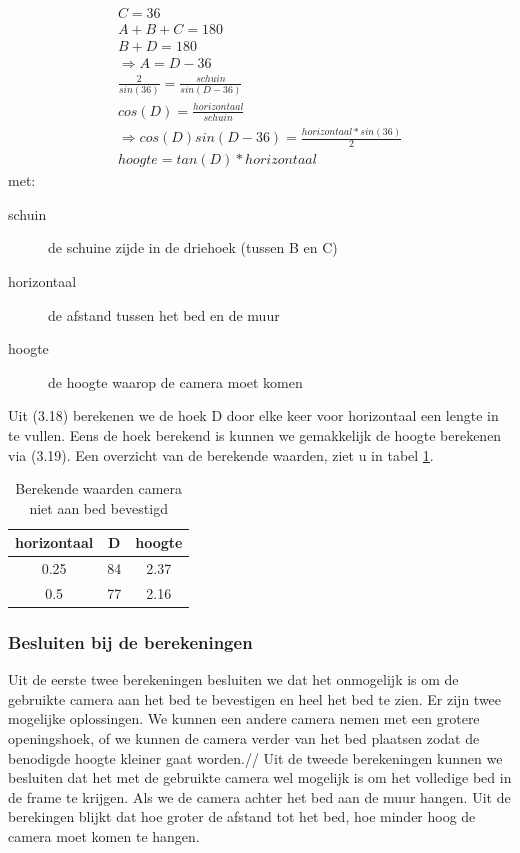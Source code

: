 \begin{gather}
C=36\\
A+B+C=180 \\
B+D=180 \\
\Rightarrow A=D-36\\
\frac{2}{sin(36)}=\frac{schuin}{sin(D-36)}\\
cos(D)=\frac{horizontaal}{schuin}\\
\Rightarrow cos(D)sin(D-36)=\frac{horizontaal*sin(36)}{2}\\
hoogte=tan(D)*horizontaal
\end{gather}
met:
\begin{description}
	\item[schuin] de schuine zijde in de driehoek (tussen B en C)
	\item[horizontaal] de afstand tussen het bed en de muur
	\item[hoogte] de hoogte waarop de camera moet komen
\end{description}
Uit (3.18) berekenen we de hoek D door elke keer voor horizontaal een lengte in te vullen. Eens de hoek berekend is kunnen we gemakkelijk de hoogte berekenen via (3.19). Een overzicht van de berekende waarden, ziet u in tabel \ref{refTabCNB}.

\begin{table}[h]
	\begin{tabular}{|c|c|c|}
	 	\hline
		horizontaal & D & hoogte \\ \hline
		0.25 & 84 & 2.37 \\ \hline
		0.5 & 77 & 2.16 \\ 
		\hline
	\end{tabular}
	\caption{Berekende waarden camera niet aan bed bevestigd}
	\label{refTabCNB}
\end{table}

\subsubsection{Besluiten bij de berekeningen}
Uit de eerste twee berekeningen besluiten we dat het onmogelijk is om de gebruikte camera aan het bed te bevestigen en heel het bed te zien. Er zijn twee mogelijke oplossingen. We kunnen een andere camera nemen met een grotere openingshoek, of we kunnen de camera verder van het bed plaatsen zodat de benodigde hoogte kleiner gaat worden.//
Uit de tweede berekeningen kunnen we besluiten dat het met de gebruikte camera wel mogelijk is om het volledige bed in de frame te krijgen. Als we de camera achter het bed aan de muur hangen. Uit de berekingen blijkt dat hoe groter de afstand tot het bed, hoe minder hoog de camera moet komen te hangen. 
